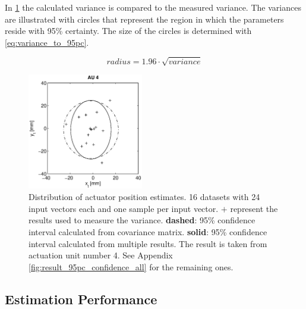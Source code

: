 In \cref{fig:result_95pc_confidence} the calculated variance is compared to the measured variance.
The variances are illustrated with circles that represent the region in which the parameters reside with 95\% certainty.
The size of the circles is determined with \cref{eq:variance_to_95pc}.

\begin{equation}
\label{eq:variance_to_95pc}
radius = 1.96 \cdot \sqrt{variance}
\end{equation}

\begin{figure}[hbtp]
\centering
\includegraphics[width = 0.45\textwidth]{images/results/confidence_95_interval_AU4.eps}
\caption{Distribution of actuator position estimates. 16 datasets with 24 input vectors each and one sample per input vector.
$\mathbf{+}$ represent the results used to measure the variance.
\textbf{dashed}: 95\% confidence interval calculated from covariance matrix.
\textbf{solid}: 95\% confidence interval calculated from multiple results. The result is taken from actuation unit number 4. See Appendix \cref{fig:result_95pc_confidence_all} for the remaining ones.}
\label{fig:result_95pc_confidence}
\end{figure}

\subsection{Estimation Performance}
\label{sub:est_perf}

